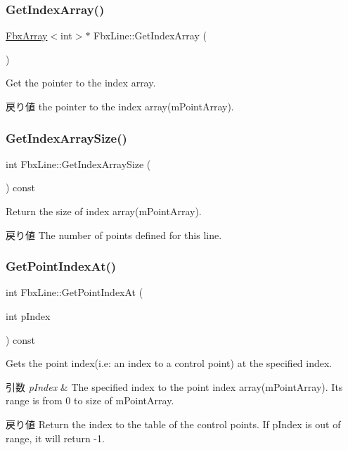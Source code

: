\subsubsection{\texorpdfstring{Get\+Index\+Array()}{GetIndexArray()}}
{\footnotesize\ttfamily \hyperlink{class_fbx_array}{Fbx\+Array}$<$int$>$$\ast$ Fbx\+Line\+::\+Get\+Index\+Array (\begin{DoxyParamCaption}{ }\end{DoxyParamCaption})}

Get the pointer to the index array. \begin{DoxyReturn}{戻り値}
the pointer to the index array(m\+Point\+Array). 
\end{DoxyReturn}
\mbox{\label{class_fbx_line_a8055b3ec4b3dde0a73681716a33c77f5}} 
\subsubsection{\texorpdfstring{Get\+Index\+Array\+Size()}{GetIndexArraySize()}}
{\footnotesize\ttfamily int Fbx\+Line\+::\+Get\+Index\+Array\+Size (\begin{DoxyParamCaption}{ }\end{DoxyParamCaption}) const}

Return the size of index array(m\+Point\+Array). \begin{DoxyReturn}{戻り値}
The number of points defined for this line. 
\end{DoxyReturn}
\mbox{\label{class_fbx_line_a6ff2971e12ada06a4e724b97d149a875}} 
\subsubsection{\texorpdfstring{Get\+Point\+Index\+At()}{GetPointIndexAt()}}
{\footnotesize\ttfamily int Fbx\+Line\+::\+Get\+Point\+Index\+At (\begin{DoxyParamCaption}\item[{int}]{p\+Index }\end{DoxyParamCaption}) const}

Gets the point index(i.\+e\+: an index to a control point) at the specified index. 
\begin{DoxyParams}{引数}
{\em p\+Index} & The specified index to the point index array(m\+Point\+Array). Its range is from 0 to size of m\+Point\+Array. \\
\hline
\end{DoxyParams}
\begin{DoxyReturn}{戻り値}
Return the index to the table of the control points. If p\+Index is out of range, it will return -\/1. 
\end{DoxyReturn}
\mbox{\label{class_fbx_line_a68cc770a24367ac688fa3f96cdd5ed1f}} 
